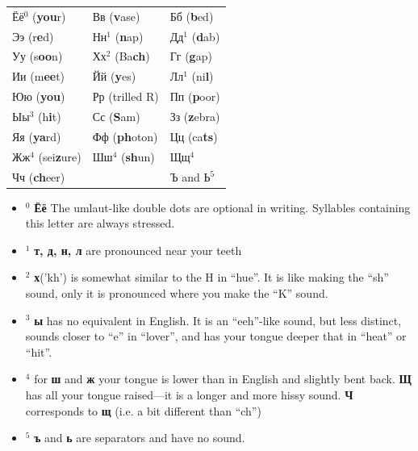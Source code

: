 \begin{longtable}[]{@{}lll@{}}
\toprule
Ёё$^0$ (\textbf{you}r) & Вв (\textbf{v}ase) & Бб
(\textbf{b}ed)\tabularnewline
Ээ (r\textbf{e}d) & Нн$^1$ (\textbf{n}ap) & Дд$^1$
(\textbf{d}ab)\tabularnewline
Уу (s\textbf{oo}n) & Хх$^2$ (Ba\textbf{ch}) & Гг
(\textbf{g}ap)\tabularnewline
Ии (m\textbf{ee}t) & Йй (\textbf{y}es) & Лл$^1$
(ni\textbf{l})\tabularnewline
Юю (\textbf{you}) & Рр (trilled R) & Пп (\textbf{p}oor)\tabularnewline
Ыы$^3$ (h\textbf{i}t) & Сс (\textbf{S}am) & Зз
(\textbf{z}ebra)\tabularnewline
Яя (\textbf{ya}rd) & Фф (\textbf{ph}oton) & Цц
(ca\textbf{ts})\tabularnewline
Жж$^4$ (sei\textbf{z}ure) & Шш$^4$ (\textbf{sh}un) & Щщ$^4$\tabularnewline
\begin{minipage}[t]{0.32\columnwidth}\raggedright\strut
Чч (\textbf{ch}eer)\strut
\end{minipage} & \begin{minipage}[t]{0.32\columnwidth}\raggedright\strut
\strut
\end{minipage} & \begin{minipage}[t]{0.32\columnwidth}\raggedright\strut
Ъ and Ь$^5$\strut
\end{minipage}\tabularnewline
\bottomrule
\end{longtable}

\begin{itemize}
\tightlist
\item
  $^0$ \textbf{Ёё} The umlaut-like double dots are optional in writing.
  Syllables containing this letter are always stressed.
\item
  $^1$ \textbf{т, д, н, л} are pronounced near your teeth
\item
  $^2$ \textbf{х}('kh') is somewhat similar to the H in ``hue''. It is like
  making the ``sh'' sound, only it is pronounced where you make the
  ``K'' sound.
\item
  $^3$ \textbf{ы} has no equivalent in English. It is an ``eeh''-like
  sound, but less distinct, sounds closer to ``e'' in ``lover'', and has
  your tongue deeper that in ``heat'' or ``hit''.
\item
  $^4$ for \textbf{ш} and \textbf{ж} your tongue is lower than in English
  and slightly bent back. \textbf{Щ} has all your tongue raised---it is
  a longer and more hissy sound. \textbf{Ч} corresponds to \textbf{щ}
  (i.e. a bit different than ``ch'')
\item
  $^5$ \textbf{ъ} and \textbf{ь} are separators and have no sound.
\end{itemize}

